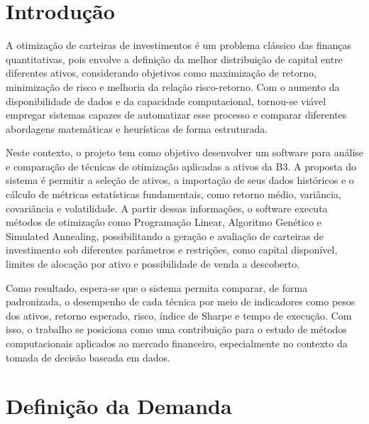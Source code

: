 \documentclass[
	12pt,				%
	openright,			%
	oneside,			    %
	a4paper,				%
	english,			%
	french,			%
	spanish,			%
	brazil			%
	]{abntex2}
\begin{document}
\frenchspacing

\imprimircapa

\tableofcontents*
\cleardoublepage

\textual

\chapter{Introdução}

A otimização de carteiras de investimentos é um problema clássico das finanças quantitativas, pois envolve a definição da melhor distribuição de capital entre diferentes ativos, considerando objetivos como maximização de retorno, minimização de risco e melhoria da relação risco-retorno. Com o aumento da disponibilidade de dados e da capacidade computacional, tornou-se viável empregar sistemas capazes de automatizar esse processo e comparar diferentes abordagens matemáticas e heurísticas de forma estruturada.

Neste contexto, o projeto tem como objetivo desenvolver um software para análise e comparação de técnicas de otimização aplicadas a ativos da B3. A proposta do sistema é permitir a seleção de ativos, a importação de seus dados históricos e o cálculo de métricas estatísticas fundamentais, como retorno médio, variância, covariância e volatilidade. A partir dessas informações, o software executa métodos de otimização como Programação Linear, Algoritmo Genético e Simulated Annealing, possibilitando a geração e avaliação de carteiras de investimento sob diferentes parâmetros e restrições, como capital disponível, limites de alocação por ativo e possibilidade de venda a descoberto.

Como resultado, espera-se que o sistema permita comparar, de forma padronizada, o desempenho de cada técnica por meio de indicadores como pesos dos ativos, retorno esperado, risco, índice de Sharpe e tempo de execução. Com isso, o trabalho se posiciona como uma contribuição para o estudo de métodos computacionais aplicados ao mercado financeiro, especialmente no contexto da tomada de decisão baseada em dados.

\chapter{Definição da Demanda}
\end{document}
